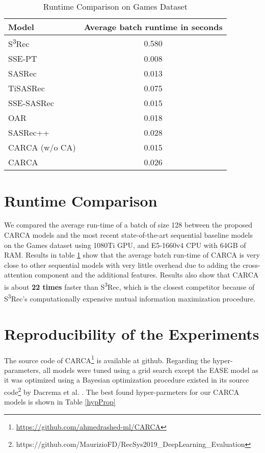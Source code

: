 \documentclass[sigconf,natbib=true]{acmart}
\begin{document}
\begin{table}[!ht]
\caption{Runtime Comparison on Games Dataset}
\label{Runt}
\footnotesize
\begin{tabular}{lc}
\toprule
Model          & Average batch runtime in seconds \\
\midrule
S\textsuperscript{3}Rec      & 0.580                             \\
SSE-PT         & 0.008                            \\
SASRec        & 0.013                            \\
TiSASRec        & 0.075                          \\
SSE-SASRec     & 0.015                            \\
OAR            & 0.018                            \\
\midrule
SASRec++       & 0.028                            \\
\midrule
CARCA (w/o CA) & 0.015                            \\
CARCA          & 0.026                           \\
\bottomrule
\end{tabular}
\end{table}


\appendix
\section{Runtime Comparison}

We compared the average run-time of a batch of size 128 between the proposed CARCA models and the most recent state-of-the-art sequential baseline models on the Games dataset using 1080Ti GPU, and E5-1660v4 CPU with 64GB of RAM. Results in table \ref{Runt} show that the average batch run-time of CARCA is very close to other sequential models with very little overhead due to adding the cross-attention component and the additional features. Results also show that CARCA is about \textbf{22 times} faster than S\textsuperscript{3}Rec, which is the closest competitor because of S\textsuperscript{3}Rec's computationally expensive mutual information maximization procedure. 









\section{Reproducibility of the Experiments}
The source code of CARCA\footnote{\url{https://github.com/ahmedrashed-ml/CARCA}} is available at github. Regarding the hyper-parameters, all models were tuned using a grid search except the EASE model as it was optimized using a Bayesian optimization procedure existed in its source code\footnote{https://github.com/MaurizioFD/RecSys2019\_DeepLearning\_Evaluation} by Dacrema et al. \cite{dacrema2019we}. The best found hyper-parmeters for our CARCA models is shown in Table \ref{hypProp}
\end{document}
